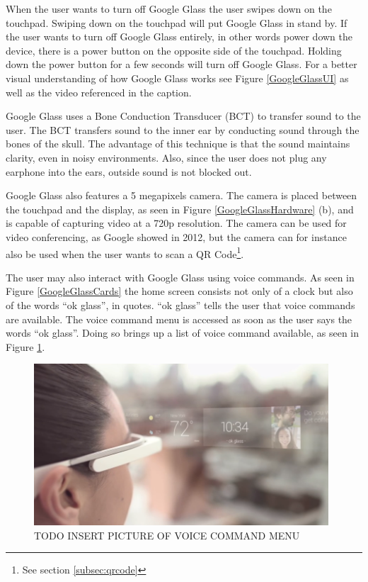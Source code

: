 When the user wants to turn off Google Glass the user swipes down on the touchpad. Swiping down on the touchpad will put Google Glass in stand by. If the user wants to turn off Google Glass entirely, in other words power down the device, there is a power button on the opposite side of the touchpad. Holding down the power button for a few seconds will turn off Google Glass. For a better visual understanding of how Google Glass works see Figure \ref{GoogleGlassUI} as well as the video referenced in the caption.

Google Glass uses a Bone Conduction Transducer (BCT) to transfer sound to the user.\cite{GlassSpecs} The BCT transfers sound to the inner ear by conducting sound through the bones of the skull.\cite{boneConductionWiki} The advantage of this technique is that the sound maintains clarity, even in noisy environments. Also, since the user does not plug any earphone into the ears, outside sound is not blocked out.

Google Glass also features a 5 megapixels camera. The camera is placed between the touchpad and the display, as seen in Figure \ref{GoogleGlassHardware} (b), and is capable of capturing video at a 720p resolution. The camera can be used for video conferencing, as Google showed in 2012\cite{glassLiveDemo}, but the camera can for instance also be used when the user wants to scan a QR Code\footnote{See section \ref{subsec:qrcode}}.

The user may also interact with Google Glass using voice commands. As seen in Figure \ref{GoogleGlassCards} the home screen consists not only of a clock but also of the words ``ok glass'', in quotes. ``ok glass'' tells the user that voice commands are available. The voice command menu is accessed as soon as the user says the words ``ok glass''. Doing so brings up a list of voice command available, as seen in Figure \ref{voiceCommandMenu}.

	\begin{figure}[ht!]
		\centering
		\includegraphics[width=110mm]{images/GoogleGlassUI}
		\caption{TODO INSERT PICTURE OF VOICE COMMAND MENU}
		\label{voiceCommandMenu}
	\end{figure}

